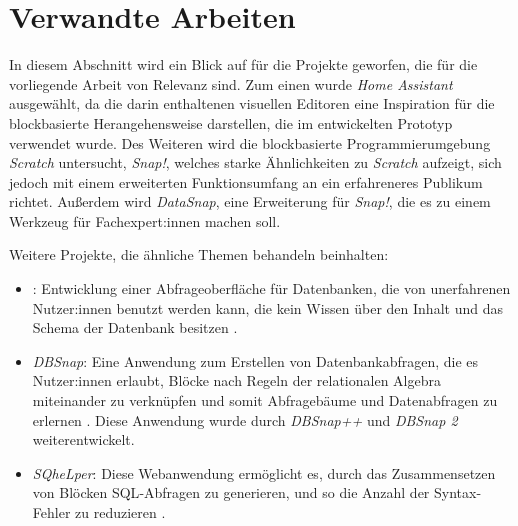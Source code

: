 \section{Verwandte Arbeiten}

In diesem Abschnitt wird ein Blick auf für die Projekte geworfen, die für die vorliegende Arbeit von Relevanz sind. Zum einen wurde \textit{Home Assistant} ausgewählt, da die darin enthaltenen visuellen Editoren eine Inspiration für die blockbasierte Herangehensweise darstellen, die im entwickelten Prototyp verwendet wurde. Des Weiteren wird die blockbasierte Programmierumgebung \textit{Scratch} untersucht, \textit{Snap!}, welches starke Ähnlichkeiten zu \textit{Scratch} aufzeigt, sich jedoch mit einem erweiterten Funktionsumfang an ein erfahreneres Publikum richtet. Außerdem wird \textit{DataSnap}, eine Erweiterung für \textit{Snap!}, die es zu einem Werkzeug für Fachexpert:innen machen soll.

Weitere Projekte, die ähnliche Themen behandeln beinhalten:
\begin{itemize}
  \item \textit{}: Entwicklung einer Abfrageoberfläche für Datenbanken, die von unerfahrenen Nutzer:innen benutzt werden kann, die kein Wissen über den Inhalt und das Schema der Datenbank besitzen \parencite{pazosr.InterfaceComposing2015}.
  \item \textit{DBSnap}: Eine Anwendung zum Erstellen von Datenbankabfragen, die es Nutzer:innen erlaubt, Blöcke nach Regeln der relationalen Algebra miteinander zu verknüpfen und somit Abfragebäume und Datenabfragen zu erlernen \parencite{silvaDBSnapLearning2015}. Diese Anwendung wurde durch \textit{DBSnap++} \parencite{silvaDBSnapCreating2018} und \textit{DBSnap 2} \parencite{silvaDBSnapNew2022} weiterentwickelt.
  \item \textit{SQheLper}: Diese Webanwendung ermöglicht es, durch das Zusammensetzen von Blöcken \acs{SQL}-Abfragen zu generieren, und so die Anzahl der Syntax-Fehler zu reduzieren \parencite{jacobsSQheLperBlockbased2021}.
\end{itemize}
